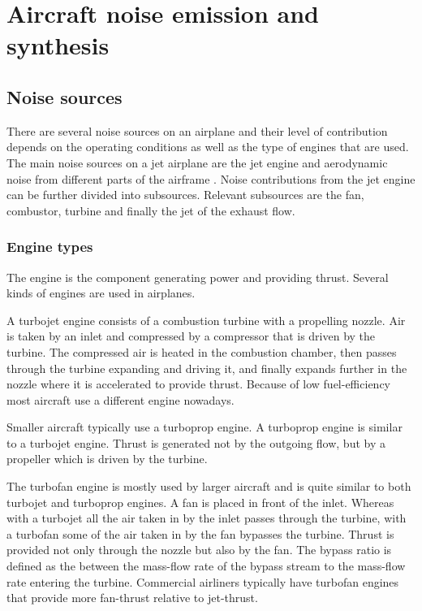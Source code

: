 \section{Aircraft noise emission and synthesis}


\subsection{Noise sources}

There are several noise sources on an airplane and their level of contribution
depends on the operating conditions as well as the type of engines that are
used. The main noise sources on a jet airplane are the jet engine and
aerodynamic noise from different parts of the airframe \cite{Zaporozhets2011}.
Noise contributions from the jet engine can be further divided into subsources.
Relevant subsources are the fan, combustor, turbine and finally the jet of the
exhaust flow.

\subsubsection{Engine types}
The engine is the component generating power and providing thrust. Several kinds
of engines are used in airplanes.

A turbojet engine consists of a combustion turbine with a propelling nozzle. Air
is taken by an inlet and compressed by a compressor that is driven by the
turbine. The compressed air is heated in the combustion chamber, then passes
through the turbine expanding and driving it, and finally expands further in the
nozzle where it is accelerated to provide thrust. Because of low fuel-efficiency
most aircraft use a different engine nowadays.

Smaller aircraft typically use a turboprop engine. A turboprop engine is similar
to a turbojet engine. Thrust is generated not by the outgoing flow, but by a
propeller which is driven by the turbine.

The turbofan engine is mostly used by larger aircraft and is quite similar to
both turbojet and turboprop engines. A fan is placed in front of the inlet.
Whereas with a turbojet all the air taken in by the inlet passes through the
turbine, with a turbofan some of the air taken in by the fan bypasses the
turbine. Thrust is provided not only through the nozzle but also by the fan. The
bypass ratio is defined as the between the mass-flow rate of the bypass stream
to the mass-flow rate entering the turbine. Commercial airliners typically have
 turbofan engines that provide more fan-thrust relative to
jet-thrust.

